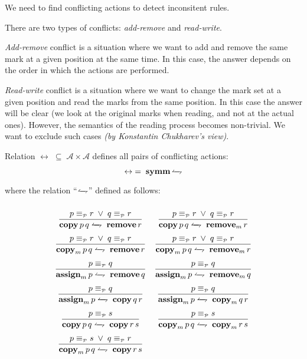 \documentclass{article}
\newcommand{\primi}[1]{\mathbf{#1}}
\newcommand{\lrharpoon}{
  \mathrlap{\leftharpoonup}%
  \rightharpoondown
}
\newcommand{\trule}[2]{\dfrac{#1}{#2}}
\newcommand{\cActions}{\leftrightarrow}
\newcommand{\pEquiv}{\equiv_{\scriptscriptstyle{\mathcal{P}}}}
\begin{document}
We need to find conflicting actions to detect inconsitent rules.

There are two types of conflicts: \textit{add-remove} and \textit{read-write}.

\textit{Add-remove} conflict is a situation where we want to add and remove the same mark at a given position at the same time. In this case, the answer depends on the order in which the actions are performed.

\textit{Read-write} conflict is a situation where we want to change the mark set at a given position and read the marks from the same position. In this case the answer will be clear (we look at the original marks when reading, and not at the actual ones). However, the semantics of the reading process becomes non-trivial. We want to exclude such cases \textit{(by Konstantin Chukharev's view)}.


\noindent Relation $\cActions\;\subseteq\;\mathcal{A}\times\mathcal{A}$ defines all pairs of conflicting actions:

\[
\cActions \;=\;\primi{symm}\,\lrharpoon
\]

where the relation ``$\lrharpoon$'' defined as follows:

\[
\renewcommand{\arraystretch}{2.5}
\renewcommand{\cActions}{\lrharpoon}
\begin{array}{cc}
\trule
    {p\pEquiv r\;\vee\; q\pEquiv r}
    {{\primi{copy}\,p\,q}\;\cActions\;{\primi{remove}\,r}}
    &
\trule
    {p\pEquiv r\;\vee\; q\pEquiv r}
    {{\primi{copy}\,p\,q}\;\cActions\;{\primi{remove}_m\,r}}\\

\trule
    {p\pEquiv r\;\vee\; q\pEquiv r}
    {{\primi{copy}_m\,p\,q}\;\cActions\;{\primi{remove}\,r}}
    &
\trule
    {p\pEquiv r\;\vee\; q\pEquiv r}
    {{\primi{copy}_m\,p\,q}\;\cActions\;{\primi{remove}_m\,r}}\\

\trule
    {p\pEquiv q}
    {{\primi{assign}_m\,p}\;\cActions\;{\primi{remove}\,q}}
    &
\trule
    {p\pEquiv q}
    {{\primi{assign}_m\,p}\;\cActions\;{\primi{remove}_m\,q}}\\

\trule
    {p\pEquiv q}
    {{\primi{assign}_m\,p}\;\cActions\;{\primi{copy}\,q\,r}}
    &
\trule
    {p\pEquiv q}
    {{\primi{assign}_m\,p}\;\cActions\;{\primi{copy}_m\,q\,r}}\\
    
\trule
    {p\pEquiv s}
    {{\primi{copy}\,p\,q}\;\cActions\;{\primi{copy}\,r\,s}}
    &
\trule
    {p\pEquiv s}
    {{\primi{copy}_m\,p\,q}\;\cActions\;{\primi{copy}_m\,r\,s}}\\

\trule
    {p\pEquiv s\;\vee\;q\pEquiv r}
    {{\primi{copy}_m\,p\,q}\;\cActions\;{\primi{copy}\,r\,s}}
    &
\end{array}
\]
\end{document}
